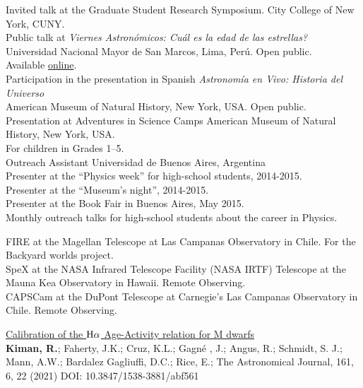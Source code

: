 \documentclass[10pt]{cv}
\newcommand\tab[1][1cm]{\hspace*{#1}}
\begin{document}
\begin{llist}

Invited talk at the Graduate Student Research Symposium.	
City College of New York, CUNY.	\\
Public talk at \textit{Viernes Astron\'omicos: Cu\'al es la edad de las estrellas?}
Universidad Nacional Mayor de San Marcos, Lima, Per\'u. Open public.\\
Available \href{https://www.youtube.com/watch?v=QOlgG1b41hU&ab_channel=AstronomySanMarcos}{online}.\\
Participation in the presentation in Spanish
\textit{Astronom\'ia en Vivo: Historia del Universo}\\
American Museum of Natural History, New York, USA. Open public.\\
Presentation at Adventures in Science Camps
American Museum of Natural History, New York, USA. \\
For children in Grades 1--5.\\
Outreach Assistant
Universidad de Buenos Aires, Argentina\\
\tab Presenter at the ``Physics week'' for high-school students, 2014-2015.\\
\tab Presenter at the ``­Museum's night'', 2014-2015.\\
\tab Presenter at the Book Fair in Buenos Aires, May 2015.\\
\tab Monthly outreach talks for high-school students about the career in Physics.


FIRE at the Magellan Telescope at Las Campanas Observatory
 in Chile. For the Backyard worlds project. \\
SpeX at the NASA Infrared Telescope Facility (NASA IRTF) 	
Telescope at the Mauna Kea Observatory in Hawaii. Remote Observing. \\
CAPSCam at the DuPont Telescope	
at Carnegie's Las Campanas Observatory in Chile. Remote Observing.




\href{https://ui.adsabs.harvard.edu/abs/2021AJ....161..277K/abstract}{Calibration of the ${\rm H}\alpha$ Age-Activity relation for M dwarfs}\\
\textbf{Kiman, R.}; Faherty, J.K.; Cruz, K.L.; Gagn\'e , J.; Angus, R.; Schmidt, S. J.; Mann, A.W.; Bardalez Gagliuffi, D.C.; Rice, E.; The Astronomical Journal, 161, 6, 22 (2021) DOI: 10.3847/1538-3881/abf561



\end{llist}
\end{document}
